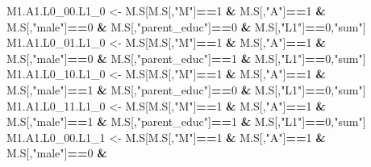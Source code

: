 \documentclass[
]{book}
\newenvironment{Shaded}{\begin{snugshade}}{\end{snugshade}}
\newcommand{\DecValTok}[1]{\textcolor[rgb]{0.00,0.00,0.81}{#1}}
\newcommand{\NormalTok}[1]{#1}
\newcommand{\OtherTok}[1]{\textcolor[rgb]{0.56,0.35,0.01}{#1}}
\newcommand{\SpecialCharTok}[1]{\textcolor[rgb]{0.81,0.36,0.00}{\textbf{#1}}}
\newcommand{\StringTok}[1]{\textcolor[rgb]{0.31,0.60,0.02}{#1}}
\begin{document}
\begin{Shaded}
\begin{Highlighting}[]
\NormalTok{  M1.A1.L0\_00.L1\_0 }\OtherTok{\textless{}{-}}\NormalTok{ M.S[M.S[,}\StringTok{"M"}\NormalTok{]}\SpecialCharTok{==}\DecValTok{1} \SpecialCharTok{\&}\NormalTok{ M.S[,}\StringTok{"A"}\NormalTok{]}\SpecialCharTok{==}\DecValTok{1} \SpecialCharTok{\&}\NormalTok{ M.S[,}\StringTok{"male"}\NormalTok{]}\SpecialCharTok{==}\DecValTok{0} \SpecialCharTok{\&} 
\NormalTok{                            M.S[,}\StringTok{"parent\_educ"}\NormalTok{]}\SpecialCharTok{==}\DecValTok{0} \SpecialCharTok{\&}\NormalTok{ M.S[,}\StringTok{"L1"}\NormalTok{]}\SpecialCharTok{==}\DecValTok{0}\NormalTok{,}\StringTok{"sum"}\NormalTok{]}
\NormalTok{  M1.A1.L0\_01.L1\_0 }\OtherTok{\textless{}{-}}\NormalTok{ M.S[M.S[,}\StringTok{"M"}\NormalTok{]}\SpecialCharTok{==}\DecValTok{1} \SpecialCharTok{\&}\NormalTok{ M.S[,}\StringTok{"A"}\NormalTok{]}\SpecialCharTok{==}\DecValTok{1} \SpecialCharTok{\&}\NormalTok{ M.S[,}\StringTok{"male"}\NormalTok{]}\SpecialCharTok{==}\DecValTok{0} \SpecialCharTok{\&} 
\NormalTok{                            M.S[,}\StringTok{"parent\_educ"}\NormalTok{]}\SpecialCharTok{==}\DecValTok{1} \SpecialCharTok{\&}\NormalTok{ M.S[,}\StringTok{"L1"}\NormalTok{]}\SpecialCharTok{==}\DecValTok{0}\NormalTok{,}\StringTok{"sum"}\NormalTok{]}
\NormalTok{  M1.A1.L0\_10.L1\_0 }\OtherTok{\textless{}{-}}\NormalTok{ M.S[M.S[,}\StringTok{"M"}\NormalTok{]}\SpecialCharTok{==}\DecValTok{1} \SpecialCharTok{\&}\NormalTok{ M.S[,}\StringTok{"A"}\NormalTok{]}\SpecialCharTok{==}\DecValTok{1} \SpecialCharTok{\&}\NormalTok{ M.S[,}\StringTok{"male"}\NormalTok{]}\SpecialCharTok{==}\DecValTok{1} \SpecialCharTok{\&} 
\NormalTok{                            M.S[,}\StringTok{"parent\_educ"}\NormalTok{]}\SpecialCharTok{==}\DecValTok{0} \SpecialCharTok{\&}\NormalTok{ M.S[,}\StringTok{"L1"}\NormalTok{]}\SpecialCharTok{==}\DecValTok{0}\NormalTok{,}\StringTok{"sum"}\NormalTok{]}
\NormalTok{  M1.A1.L0\_11.L1\_0 }\OtherTok{\textless{}{-}}\NormalTok{ M.S[M.S[,}\StringTok{"M"}\NormalTok{]}\SpecialCharTok{==}\DecValTok{1} \SpecialCharTok{\&}\NormalTok{ M.S[,}\StringTok{"A"}\NormalTok{]}\SpecialCharTok{==}\DecValTok{1} \SpecialCharTok{\&}\NormalTok{ M.S[,}\StringTok{"male"}\NormalTok{]}\SpecialCharTok{==}\DecValTok{1} \SpecialCharTok{\&} 
\NormalTok{                            M.S[,}\StringTok{"parent\_educ"}\NormalTok{]}\SpecialCharTok{==}\DecValTok{1} \SpecialCharTok{\&}\NormalTok{ M.S[,}\StringTok{"L1"}\NormalTok{]}\SpecialCharTok{==}\DecValTok{0}\NormalTok{,}\StringTok{"sum"}\NormalTok{]}
\NormalTok{  M1.A1.L0\_00.L1\_1 }\OtherTok{\textless{}{-}}\NormalTok{ M.S[M.S[,}\StringTok{"M"}\NormalTok{]}\SpecialCharTok{==}\DecValTok{1} \SpecialCharTok{\&}\NormalTok{ M.S[,}\StringTok{"A"}\NormalTok{]}\SpecialCharTok{==}\DecValTok{1} \SpecialCharTok{\&}\NormalTok{ M.S[,}\StringTok{"male"}\NormalTok{]}\SpecialCharTok{==}\DecValTok{0} \SpecialCharTok{\&} 

\end{Highlighting}
\end{Shaded}
\end{document}
